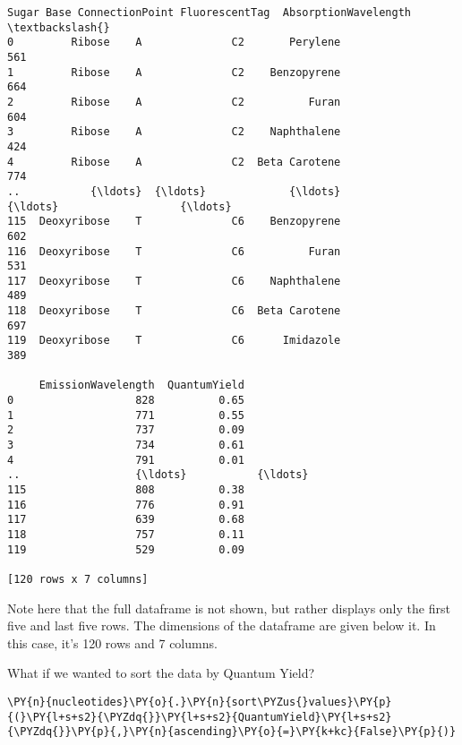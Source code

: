     
    \begin{Verbatim}[commandchars=\\\{\}]
           Sugar Base ConnectionPoint FluorescentTag  AbsorptionWavelength  \textbackslash{}
0         Ribose    A              C2       Perylene                   561   
1         Ribose    A              C2    Benzopyrene                   664   
2         Ribose    A              C2          Furan                   604   
3         Ribose    A              C2    Naphthalene                   424   
4         Ribose    A              C2  Beta Carotene                   774   
..           {\ldots}  {\ldots}             {\ldots}            {\ldots}                   {\ldots}   
115  Deoxyribose    T              C6    Benzopyrene                   602   
116  Deoxyribose    T              C6          Furan                   531   
117  Deoxyribose    T              C6    Naphthalene                   489   
118  Deoxyribose    T              C6  Beta Carotene                   697   
119  Deoxyribose    T              C6      Imidazole                   389   

     EmissionWavelength  QuantumYield  
0                   828          0.65  
1                   771          0.55  
2                   737          0.09  
3                   734          0.61  
4                   791          0.01  
..                  {\ldots}           {\ldots}  
115                 808          0.38  
116                 776          0.91  
117                 639          0.68  
118                 757          0.11  
119                 529          0.09  

[120 rows x 7 columns]
    \end{Verbatim}

    
    Note here that the full dataframe is not shown, but rather displays only
the first five and last five rows. The dimensions of the dataframe are
given below it. In this case, it's 120 rows and 7 columns.

What if we wanted to sort the data by Quantum Yield?

    \begin{tcolorbox}[breakable, size=fbox, boxrule=1pt, pad at break*=1mm,colback=cellbackground, colframe=cellborder]
\begin{Verbatim}[commandchars=\\\{\}]
\PY{n}{nucleotides}\PY{o}{.}\PY{n}{sort\PYZus{}values}\PY{p}{(}\PY{l+s+s2}{\PYZdq{}}\PY{l+s+s2}{QuantumYield}\PY{l+s+s2}{\PYZdq{}}\PY{p}{,}\PY{n}{ascending}\PY{o}{=}\PY{k+kc}{False}\PY{p}{)}
\end{Verbatim}
\end{tcolorbox}


